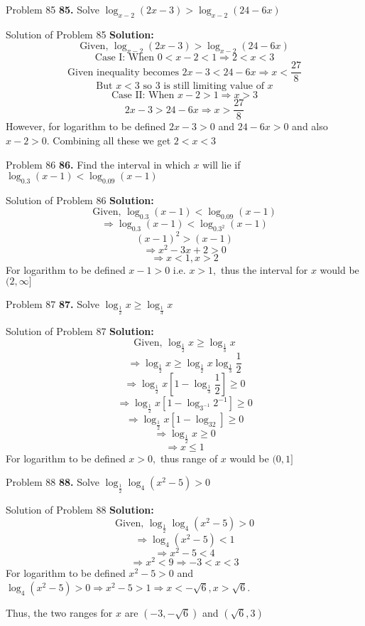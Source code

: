\documentclass[aspectratio=1610,8pt]{beamer}
\begin{document}
\begin{frame}{Problem 85}
  \textbf{85.} Solve $\log_{x - 2}(2x - 3) >\log_{x - 2}(24 - 6x)$
\end{frame}
\begin{frame}{Solution of Problem 85}
  \textbf{Solution:} $$\text{Given,~}\log_{x - 2}(2x - 3) > \log_{x - 2}(24 - 6x)$$
  $$\text{Case I: When~} 0 < x - 2 < 1 \Rightarrow 2< x < 3$$
  $$\text{Given inequality becomes~} 2x - 3 < 24 - 6x \Rightarrow x < \frac{27}{8}$$
  $$\text{But~}x < 3\text{~so~}3\text{~is still limiting value of~}x$$
  $$\text{Case II: When~}x - 2 > 1 \Rightarrow x > 3$$
  $$2x - 3 > 24 - 6x\Rightarrow x > \frac{27}{8}$$
  However, for logarithm to be defined $2x - 3 > 0$ and $24 - 6x > 0$ and also $x - 2 > 0.$ Combining all these we get $2 < x < 3$
\end{frame}
\begin{frame}{Problem 86}
  \textbf{86.} Find the interval in which $x$ will lie if $\log_{0.3}(x - 1) < \log_{0.09}(x - 1)$
\end{frame}
\begin{frame}{Solution of Problem 86}
  \textbf{Solution:} $$\text{Given,~}\log_{0.3}(x - 1) < \log_{0.09}(x - 1)$$
  $$\Rightarrow \log_{0.3}(x - 1) < \log_{0.3^2}(x - 1)$$
  $$(x - 1)^2 > (x - 1)$$
  $$\Rightarrow x^2 - 3x + 2 > 0$$
  $$\Rightarrow x < 1, x > 2$$
  For logarithm to be defined $x - 1 > 0$ i.e. $x > 1,$ thus the interval for $x$ would be $(2, \infty]$
\end{frame}
\begin{frame}{Problem 87}
  \textbf{87.} Solve $\log_{\frac{1}{2}}x \geq \log_{\frac{1}{3}}x$
\end{frame}
\begin{frame}{Solution of Problem 87}
  \textbf{Solution:} $$\text{Given,~}\log_{\frac{1}{2}}x \geq \log_{\frac{1}{3}}x$$
  $$\Rightarrow \log_{\frac{1}{2}}x \geq \log_{\frac{1}{2}}x\log_{\frac{1}{3}}\frac{1}{2}$$
  $$\Rightarrow \log_{\frac{1}{2}}x\left[1 - \log_{\frac{1}{3}}\frac{1}{2}\right]\geq 0$$
  $$\Rightarrow \log_{\frac{1}{2}}x\left[1 - \log_{3^{-1}}2^{-1}\right]\geq 0$$
  $$\Rightarrow \log_{\frac{1}{2}}x\left[1 - \log_32\right]\geq 0$$
  $$\Rightarrow \log_{\frac{1}{2}}x \geq 0$$
  $$\Rightarrow x \leq 1$$
  For logarithm to be defined $x > 0,$ thus range of $x$ would be $(0, 1]$
\end{frame}
\begin{frame}{Problem 88}
  \textbf{88.} Solve $\log_{\frac{1}{2}}\log_4(x^2 - 5) > 0$
\end{frame}
\begin{frame}{Solution of Problem 88}
  \textbf{Solution:} $$\text{Given,~}\log_{\frac{1}{2}}\log_4(x^2 - 5) > 0$$
  $$\Rightarrow \log_4(x^2 - 5) < 1$$
  $$\Rightarrow x^2 - 5 < 4$$
  $$\Rightarrow x^2 < 9 \Rightarrow -3 < x < 3$$
  For logarithm to be defined $x^2 - 5 > 0$ and $\log_4(x^2 - 5)>0 \Rightarrow x^2 - 5 > 1 \Rightarrow x < -\sqrt{6}, x > \sqrt{6}$.

  Thus, the two ranges for $x$ are $(-3, -\sqrt{6})$ and $(\sqrt{6}, 3)$
\end{frame}
\end{document}
